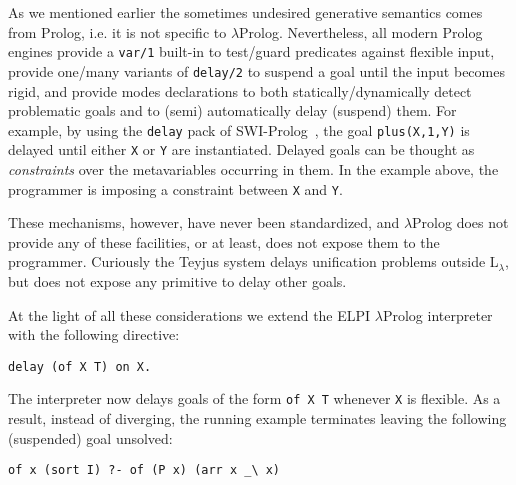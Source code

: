 \documentclass{easychair}
\begin{document}
As we mentioned earlier the sometimes undesired generative semantics
comes from Prolog, i.e. it is not specific to $\lambda$Prolog.
Nevertheless, all modern Prolog engines provide a \verb+var/1+
built-in to test/guard predicates against flexible input, provide
one/many variants of \verb+delay/2+ to suspend a goal until the input
becomes rigid, and provide modes declarations to both
statically/dynamically detect problematic goals and to (semi)
automatically delay (suspend) them.
For example, by using the \verb+delay+ pack of SWI-Prolog~\cite{SWI}, the goal
\verb+plus(X,1,Y)+ is delayed until either \verb+X+ or \verb+Y+ are
instantiated.  Delayed goals can be thought as \emph{constraints} over the
metavariables occurring in them. In the example above, the programmer is
imposing a constraint between \verb+X+ and \verb+Y+.

These mechanisms, however, have never been standardized, and
$\lambda$Prolog does not provide any of these facilities, or at least,
does not expose them to the programmer.  Curiously the Teyjus system
delays unification problems outside L$_\lambda$, but does not expose
any primitive to delay other goals.

At the light of all these considerations we extend the ELPI
$\lambda$Prolog interpreter with the following directive:

\begin{verbatim}
delay (of X T) on X.
\end{verbatim}

The interpreter now delays goals of the form \verb+of X T+ whenever \verb+X+
is flexible.  As a result, instead of diverging, the running example
terminates leaving the following (suspended) goal unsolved:

\begin{verbatim}
of x (sort I) ?- of (P x) (arr x _\ x)
\end{verbatim}
\end{document}
